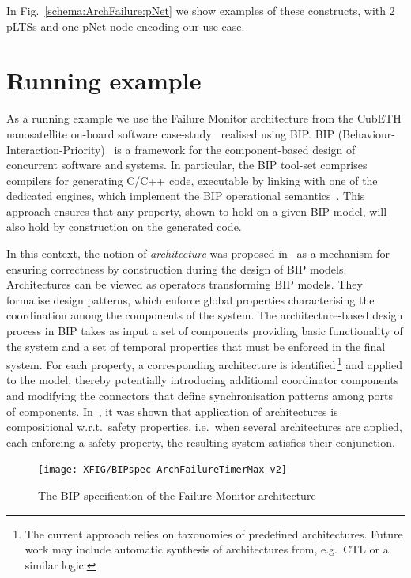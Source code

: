 \documentclass{lncs/llncs}
\newcommand{\ie}[1][\ ]{i.e.#1}
\newcommand{\eg}[1][\ ]{e.g.#1}
\newcommand{\wrt}[1][\ ]{w.r.t.#1}
\begin{document}
In Fig.~\ref{schema:ArchFailure:pNet} we show examples of these
constructs, with 2 pLTSs and one pNet node encoding our use-case.



\section{Running example}
\label{section:FailureTimerMax}
\label{section:BIParchitectures}
\label{section:examples}

As a running example we use the Failure Monitor architecture from the
CubETH nanosatellite on-board software
case-study~\cite{CubETH-case-study} realised using BIP.  BIP
(Behaviour-Interaction-Priority)~\cite{bip} is a framework for the
component-based design of concurrent software and systems.  In
particular, the BIP tool-set comprises compilers for generating C/C++
code, executable by linking with one of the dedicated engines, which
implement the BIP operational semantics~\cite{BliSif08-acp-tc}.  This
approach ensures that any property, shown to hold on a given BIP
model, will also hold by construction on the generated code.

In this context, the notion of \emph{architecture} was proposed
in~\cite{AttieBBJS16-architectures-faoc} as a mechanism for ensuring
correctness by construction during the design of BIP models.
Architectures can be viewed as operators transforming BIP models.
They formalise design patterns, which enforce global properties
characterising the coordination among the components of the system.
The architecture-based design process in BIP takes as input a set of
components providing basic functionality of the system and a set of
temporal properties that must be enforced in the final system.  For
each property, a corresponding architecture is identified\,\footnote{%
%
  The current approach relies on taxonomies of predefined
  architectures.  Future work may include automatic synthesis of
  architectures from, \eg CTL or a similar logic. 
%
} and applied to the model, thereby potentially introducing additional
coordinator components and modifying the connectors that define
synchronisation patterns among ports of components.
In~\cite{AttieBBJS16-architectures-faoc}, it was shown that
application of architectures is compositional \wrt safety properties,
\ie when several architectures are applied, each enforcing a safety
property, the resulting system satisfies their conjunction.

\begin{figure}[t]
  \centering
  \texttt{[image: XFIG/BIPspec-ArchFailureTimerMax-v2]}
  \caption{The BIP specification of the Failure Monitor architecture}
  \label{schema:ArchFailure:BIP}
\end{figure}
\end{document}
